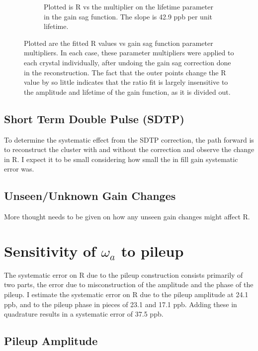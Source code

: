 \begin{figure}[]
\begin{subfigure}[t]{0.45\textwidth}
			    \caption{Plotted is R vs the multiplier on the lifetime parameter in the gain sag function. The slope is 42.9 ppb per unit lifetime.}
		    \end{subfigure}%
		\caption[InFillGain]{Plotted are the fitted R values vs gain sag function parameter multipliers. In each case, these parameter multipliers were applied to each crystal individually, after undoing the gain sag correction done in the reconstruction. The fact that the outer points change the R value by so little indicates that the ratio fit is largely insensitive to the amplitude and lifetime of the gain function, as it is divided out.}
		\label{Fig:InFillGain}
		\end{figure}


	\subsection{Short Term Double Pulse (SDTP)}

		To determine the systematic effect from the SDTP correction, the path forward is to reconstruct the cluster with and without the correction and observe the change in R. I expect it to be small considering how small the in fill gain systematic error was.

	\subsection{Unseen/Unknown Gain Changes}

		More thought needs to be given on how any unseen gain changes might affect R.

\section{Sensitivity of \texorpdfstring{$\omega_{a}$}{} to pileup}
\label{Sec:SystematicPileup}

	The systematic error on R due to the pileup construction consists primarily of two parts, the error due to misconstruction of the amplitude and the phase of the pileup. I estimate the systematic error on R due to the pileup amplitude at 24.1 ppb, and to the pileup phase in pieces of 23.1 and 17.1 ppb. Adding these in quadrature results in a systematic error of 37.5 ppb.

	\subsection{Pileup Amplitude}

